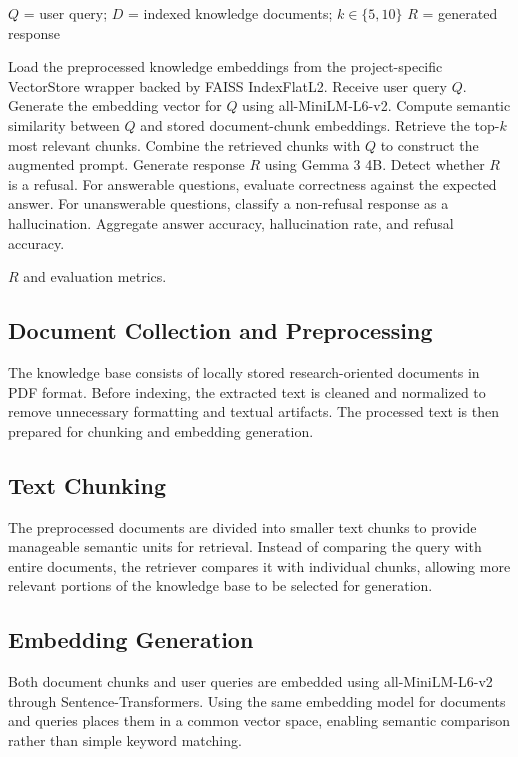 \documentclass[conference]{IEEEtran}
\begin{document}
\begin{algorithm}[t]
\caption{Retrieval-Augmented Generation Framework}
\label{alg:rag_framework}
\begin{algorithmic}[1]

\Require $Q$ = user query; $D$ = indexed knowledge documents; 
$k \in \{5,10\}$
\Ensure $R$ = generated response

\State Load the preprocessed knowledge embeddings from the project-specific VectorStore wrapper backed by FAISS IndexFlatL2.
\State Receive user query $Q$.
\State Generate the embedding vector for $Q$ using 
all-MiniLM-L6-v2.
\State Compute semantic similarity between $Q$ and stored 
document-chunk embeddings.
\State Retrieve the top-$k$ most relevant chunks.
\State Combine the retrieved chunks with $Q$ to construct the augmented prompt.
\State Generate response $R$ using Gemma 3 4B.
\State Detect whether $R$ is a refusal.
\State For answerable questions, evaluate correctness against the expected answer.
\State For unanswerable questions, classify a non-refusal response as a hallucination.
\State Aggregate answer accuracy, hallucination rate, and refusal accuracy.

\State \Return $R$ and evaluation metrics.

\end{algorithmic}
\end{algorithm}

\subsection{Document Collection and Preprocessing}
The knowledge base consists of locally stored research-oriented documents in PDF format. Before indexing, the extracted text is cleaned and normalized to remove unnecessary formatting and textual artifacts. The processed text is then prepared for chunking and embedding generation.
\subsection{Text Chunking}
The preprocessed documents are divided into smaller text chunks to provide manageable semantic units for retrieval. Instead of comparing the query with entire documents, the retriever compares it with individual chunks, allowing more relevant portions of the knowledge base to be selected for generation.
\subsection{Embedding Generation}
Both document chunks and user queries are embedded using all-MiniLM-L6-v2 through Sentence-Transformers. Using the same embedding model for documents and queries places them in a common vector space, enabling semantic comparison rather than simple keyword matching.
\end{document}
